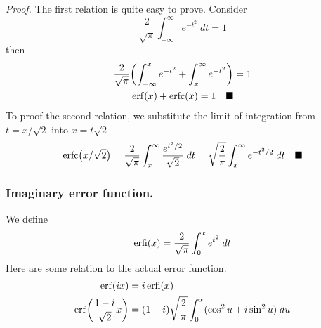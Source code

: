 \documentclass[../main.tex]{subfiles}
\begin{document}
\emph{Proof.} The first relation is quite easy to prove. Consider
\begin{equation*}
    \frac{2}{\sqrt{\pi}}\int_{-\infty}^{\infty}e^{-t^2}\;dt=1
\end{equation*}
then
\begin{align*}
    \frac{2}{\sqrt{\pi}}\biggl(\int_{-\infty}^{x}e^{-t^2}+\int_{x}^{\infty}e^{-t^2}\biggr)&=1\\
    \operatorname{erf}(x)+\operatorname{erfc}(x)=1\quad\blacksquare
\end{align*}
To proof the second relation, we substitute the limit of integration from $t=x/\sqrt{2}$ into $x=t\sqrt{2}$
\begin{align*}
    \operatorname{erfc}\bigl(x/\sqrt{2}\bigr)=\frac{2}{\sqrt{\pi}}\int_{x}^{\infty}\frac{e^{t^2/2}}{\sqrt{2}}\;dt=\sqrt{\frac{2}{\pi}}\int_{x}^{\infty}e^{-t^2/2}\;dt\quad\blacksquare
\end{align*}

\subsubsection*{Imaginary error function.} We deﬁne
\begin{equation*}
    \operatorname{erfi}(x)=\frac{2}{\sqrt{\pi}}\int_{0}^{x}e^{t^2}\;dt
\end{equation*}
Here are some relation to the actual error function.
\begin{align*}
    \operatorname{erf}(ix)&=i\operatorname{erfi}(x)\\
    \operatorname{erf}\biggl(\frac{1-i }{\sqrt{2}}x\biggr)&=(1-i   )\sqrt{\frac{2}{\pi}}\int_{0}^{x}(\cos^2u+i\sin^2u)\;du
\end{align*}
\end{document}
